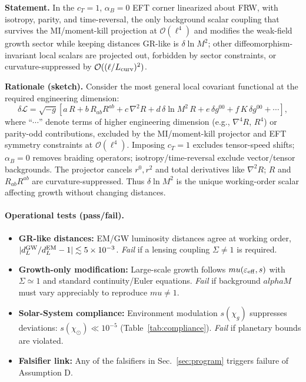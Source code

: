\documentclass[aps,prd,onecolumn,superscriptaddress,nofootinbib]{revtex4-2}
\def\mu{mu}%
\def\alpha{alpha}%
\def\alpha_M{alphaM}%
\providecommand{\be}{\begin{equation}}
\providecommand{\ee}{\end{equation}}
\begin{document}
\noindent\textbf{Statement.} In the \(c_T\!=\!1\), \(\alpha_B\!=\!0\) EFT corner linearized about FRW, with isotropy, parity, and time-reversal, the only background scalar coupling that survives the MI/moment-kill projection at \(\mathcal O(\ell^4)\) and modifies the weak-field growth sector while keeping distances GR-like is \(\delta\ln M^2\); other diffeomorphism-invariant local scalars are projected out, forbidden by sector constraints, or curvature-suppressed by \(\mathcal O((\ell/L_{\rm curv})^2)\).

\smallskip
\noindent\textbf{Rationale (sketch).} Consider the most general local covariant functional at the required engineering dimension:
\be
\delta\mathcal L=\sqrt{-g}\left[a\,R+b\,R_{ab}R^{ab}+c\,\nabla^2 R+d\,\delta\ln M^2\,R
+ e\,\delta g^{00}+ f\,K\,\delta g^{00}+ \cdots\right],
\ee
\noindent where ``\(\cdots\)'' denote terms of higher engineering dimension (e.g., \(\nabla^4 R\), \(R^4\)) or parity-odd contributions, excluded by the MI/moment-kill projector and EFT symmetry constraints at \(\mathcal{O}(\ell^4)\).
Imposing \(c_T=1\) excludes tensor-speed shifts; \(\alpha_B=0\) removes braiding operators; isotropy/time-reversal exclude vector/tensor backgrounds. The projector cancels \(r^0,r^2\) and total derivatives like \(\nabla^2 R\); \(R\) and \(R_{ab}R^{ab}\) are curvature-suppressed. Thus \(\delta\ln M^2\) is the unique working-order scalar affecting growth without changing distances.

\paragraph{Operational tests (pass/fail).}
\begin{itemize}[leftmargin=*,noitemsep,topsep=0pt]
\item \textbf{GR-like distances:} EM/GW luminosity distances agree at working order, \(|d_L^{\rm GW}/d_L^{\rm EM}-1|\lesssim5\times10^{-3}\). \emph{Fail} if a lensing coupling \(\Sigma\neq1\) is required.
\item \textbf{Growth-only modification:} Large-scale growth follows \(\mu(\varepsilon_{\rm eff},s)\) with \(\Sigma\simeq1\) and standard continuity/Euler equations. \emph{Fail} if background \(\alpha_M\) must vary appreciably to reproduce \(\mu\neq1\).
\item \textbf{Solar-System compliance:} Environment modulation \(s(\chi_g)\) suppresses deviations: \(s(\chi_\odot)\ll10^{-5}\) (Table~\ref{tab:compliance}). \emph{Fail} if planetary bounds are violated.
\item \textbf{Falsifier link:} Any of the falsifiers in Sec.~\ref{sec:program} triggers failure of Assumption D.
\end{itemize}
\end{document}
